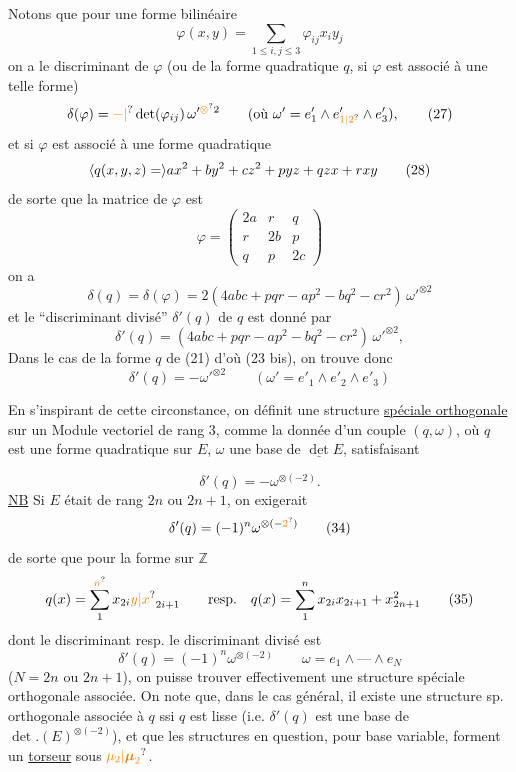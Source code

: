 Notons que pour une forme bilinéaire
\[
 \varphi(x,y)=\sum_{1\leq i,j\leq3}\varphi_{ij}x_i y_j
\]
on a le discriminant de $\varphi$ (ou de la forme quadratique $q$, si $\varphi$ est associé à une telle forme)
\[
 \delta(\varphi)=\unsure{-|}\det(\varphi_{ij})\,\omega'^{\unsure{\otimes}2}
 \qquad(\text{où }\omega'=e'_1\wedge e'_{\unsure{1|2}}\wedge e'_3), \tag*{(27)}
\]
et si $\varphi$ est associé à une forme quadratique
\[
 \inserted{q(x,y,z)=}ax^2+by^2+cz^2+pyz+qzx+rxy \tag*{(28)}
\]
de sorte que la matrice de $\varphi$ est
\[
 \varphi=\begin{pmatrix}2a&r&q\\r&2b&p\\q&p&2c\end{pmatrix} \tag*{(29)}
\]
on a
\[
 \delta(q)=\delta(\varphi)=2(4abc+pqr-ap^2-bq^2-cr^2)\,\omega'^{\otimes2} \tag*{(30)}
\]
et le ``discriminant divisé'' $\delta'(q)$ de $q$ est donné par
\[
 \delta'(q)=(4abc+pqr-ap^2-bq^2-cr^2)\,\omega'^{\otimes2}, \tag*{(31)}
\]
 Dans le cas de la forme $q$ de (21) d'où (23 bis), on trouve donc
\[
 \delta'(q)=-\omega'^{\otimes2}\qquad(\omega'=e'_1\wedge e'_2\wedge e'_3) \tag*{(32)}
\]

En s'inspirant de cette circonstance, on définit une structure \uline{spéciale orthogonale} sur un Module  vectoriel de rang 3, comme la donnée d'un couple $(q,\omega)$, où $q$ est une forme quadratique sur $E$, $\omega$ une base de $\underline{\det} E$, satisfaisant

\[
 \delta'(q)=-\omega^{\otimes(-2)} . \tag*{(33)}
\]
\uline{NB} Si $E$ était de rang $2n$ ou $2n+1$, on  exigerait
\[
 \delta'(q)=(-1)^n\omega^{\otimes(-\unsure{2})} \tag*{(34)}
\]
de sorte que pour la forme  sur $\mathbb Z$
\[
 q(x)=\sum_1^{\unsure{n}}x_{2i}\unsure{y|x}_{2i+1}
 \qquad\text{resp.}\quad q(x)=\sum_1^n x_{2i}x_{2i+1}+x_{2n+1}^2 \tag*{(35)}
\]
dont le discriminant resp. le discriminant divisé est
\[
 \delta'(q)=(-1)^n\omega^{\otimes(-2)}\qquad \omega=e_1\wedge\text{---}\wedge e_N \tag*{(36)}
\]
($N=2n$ ou $2n+1$), on puisse trouver effectivement une structure spéciale orthogonale associée. On note que, dans le cas général, il existe  une structure sp. orthogonale associée à $q$ ssi $q$ est lisse (i.e. $\delta'(q)$ est une base de $\det.(E)^{\otimes(-2)}$), et que les structures en question, pour base variable, forment un \uline{torseur} sous $\unsure{\mu_2|\boldsymbol{\mu}_2}$.

